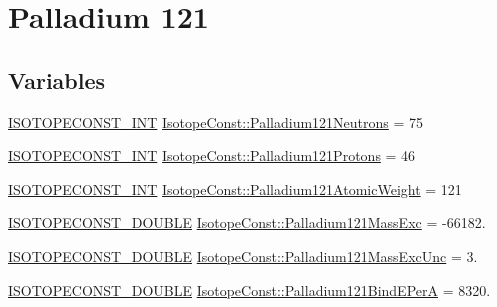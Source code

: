 \hypertarget{group___isotope_const-_palladium-_pd121}{}\section{Palladium 121}
\label{group___isotope_const-_palladium-_pd121}
\subsection*{Variables}
\begin{DoxyCompactItemize}
\item 
\mbox{\hyperlink{group___isotope_const-_macros_ga5f18360b3e99483a35c32d789e62621c}{I\+S\+O\+T\+O\+P\+E\+C\+O\+N\+S\+T\+\_\+\+I\+NT}} \mbox{\hyperlink{group___isotope_const-_palladium-_pd121_ga894455fa254a620261aba6c8938cf1dd}{Isotope\+Const\+::\+Palladium121\+Neutrons}} = 75
\item 
\mbox{\hyperlink{group___isotope_const-_macros_ga5f18360b3e99483a35c32d789e62621c}{I\+S\+O\+T\+O\+P\+E\+C\+O\+N\+S\+T\+\_\+\+I\+NT}} \mbox{\hyperlink{group___isotope_const-_palladium-_pd121_ga6b33ae60880d08122fcad784c926c676}{Isotope\+Const\+::\+Palladium121\+Protons}} = 46
\item 
\mbox{\hyperlink{group___isotope_const-_macros_ga5f18360b3e99483a35c32d789e62621c}{I\+S\+O\+T\+O\+P\+E\+C\+O\+N\+S\+T\+\_\+\+I\+NT}} \mbox{\hyperlink{group___isotope_const-_palladium-_pd121_ga45a30aef0acd2d1e7c793511e651d3dc}{Isotope\+Const\+::\+Palladium121\+Atomic\+Weight}} = 121
\item 
\mbox{\hyperlink{group___isotope_const-_macros_ga8f45a7272ce02c0b4c65c44636ed719a}{I\+S\+O\+T\+O\+P\+E\+C\+O\+N\+S\+T\+\_\+\+D\+O\+U\+B\+LE}} \mbox{\hyperlink{group___isotope_const-_palladium-_pd121_gaf67221c3238d8a035995653e6b0c60e4}{Isotope\+Const\+::\+Palladium121\+Mass\+Exc}} = -\/66182.
\item 
\mbox{\hyperlink{group___isotope_const-_macros_ga8f45a7272ce02c0b4c65c44636ed719a}{I\+S\+O\+T\+O\+P\+E\+C\+O\+N\+S\+T\+\_\+\+D\+O\+U\+B\+LE}} \mbox{\hyperlink{group___isotope_const-_palladium-_pd121_ga33d40471b78c89d9fb261c365e63b868}{Isotope\+Const\+::\+Palladium121\+Mass\+Exc\+Unc}} = 3.
\item 
\mbox{\hyperlink{group___isotope_const-_macros_ga8f45a7272ce02c0b4c65c44636ed719a}{I\+S\+O\+T\+O\+P\+E\+C\+O\+N\+S\+T\+\_\+\+D\+O\+U\+B\+LE}} \mbox{\hyperlink{group___isotope_const-_palladium-_pd121_gaf89bdcec958dcca73c60c0b8a0a1ec5a}{Isotope\+Const\+::\+Palladium121\+Bind\+E\+PerA}} = 8320.
\item 

\end{DoxyCompactItemize}
